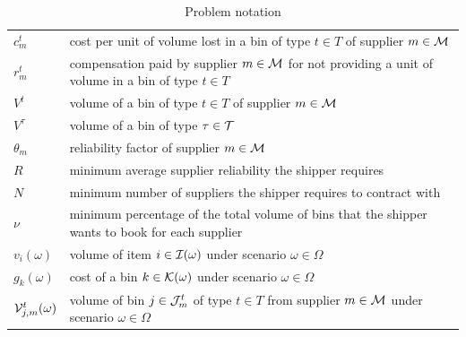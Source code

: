 \documentclass[a4paper,11pt]{article}
\begin{document}
\begin{table}[!ht]
\begin{tabular}{p{2.5cm}p{10.5cm}}
			$c^t_m$ & cost per unit of volume lost in a bin of type $t \in T$ of supplier $m \in \cal{M}$ \\
			$r^t_m$ & compensation paid by supplier $m \in \cal{M}$ for not providing a unit of volume in a bin of type $t \in T$ \\ 
			$V^{t}$ & volume of a bin of type $t \in T$ of supplier $m \in \cal{M}$ \\
			$V^{\tau}$ & volume of a bin of type $\tau \in \cal T$ \\
			$\theta_{m}$ & reliability factor of supplier $m \in \cal{M}$ \\
			$R$ & minimum average supplier reliability the shipper requires \\
			$N$ & minimum number of suppliers the shipper requires to contract with \\
			$\nu$ & minimum percentage of the total volume of bins that the shipper wants to book for each supplier \\ 
			$v_i(\omega)$ &  volume of item $i \in {\cal I}(\omega)$ under scenario $ \omega \in \Omega$ \\
			$g_k(\omega)$ & cost of a bin $k \in {\cal K}(\omega)$ under scenario $ \omega \in \Omega$ \\
			${\cal V}_{j,m}^t(\omega)$ & volume of bin $j \in {\cal J}^{t}_{m}$ of type $t \in T$ from supplier $m \in \cal M$ under scenario $ \omega \in \Omega$ \\
			\hline
		\end{tabular}
		\caption{Problem notation}
		\label{tab:notation}
	\end{table}
	
\end{document}
